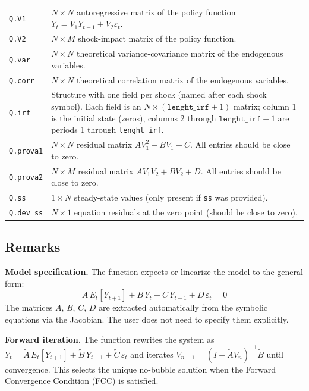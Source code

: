 \documentclass{article}
\begin{document}
\vspace{0.5em}
\begin{tabular}{@{}p{4.5cm}p{10cm}@{}}
\texttt{Q.V1} & $N \times N$ autoregressive matrix of the policy function $Y_t = V_1 Y_{t-1} + V_2 \varepsilon_t$. \\[0.2em]
\texttt{Q.V2} & $N \times M$ shock-impact matrix of the policy function. \\[0.2em]
\texttt{Q.var} & $N \times N$ theoretical variance-covariance matrix of the endogenous variables. \\[0.2em]
\texttt{Q.corr} & $N \times N$ theoretical correlation matrix of the endogenous variables. \\[0.2em]
\texttt{Q.irf} & Structure with one field per shock (named after each shock symbol). Each field is an $N \times (\texttt{lenght\_irf}+1)$ matrix; column 1 is the initial state (zeros), columns 2 through $\texttt{lenght\_irf}+1$ are periods 1 through \texttt{lenght\_irf}. \\[0.2em]
\texttt{Q.prova1} & $N \times N$ residual matrix $A V_1^2 + B V_1 + C$. All entries should be close to zero. \\[0.2em]
\texttt{Q.prova2} & $N \times M$ residual matrix $A V_1 V_2 + B V_2 + D$. All entries should be close to zero. \\[0.2em]
\texttt{Q.ss} & $1 \times N$ steady-state values (only present if \texttt{ss} was provided). \\[0.2em]
\texttt{Q.dev\_ss} & $N \times 1$ equation residuals at the zero point (should be close to zero). \\[0.2em]
\end{tabular}

\subsection{Remarks}

\noindent\textbf{Model specification.} The function expects or linearize the model to the general form:
\[
A \, E_t[Y_{t+1}] + B \, Y_t + C \, Y_{t-1} + D \, \varepsilon_t = 0
\]
The matrices $A$, $B$, $C$, $D$ are extracted automatically from the symbolic equations via the Jacobian. The user does not need to specify them explicitly.

\medskip
\noindent\textbf{Forward iteration.} The function rewrites the system as $Y_t = \tilde{A} \, E_t[Y_{t+1}] + \tilde{B} \, Y_{t-1} + \tilde{C} \, \varepsilon_t$ and iterates $V_{n+1} = (I - \tilde{A} V_n)^{-1} \tilde{B}$ until convergence. This selects the unique no-bubble solution when the Forward Convergence Condition (FCC) is satisfied.
\end{document}
